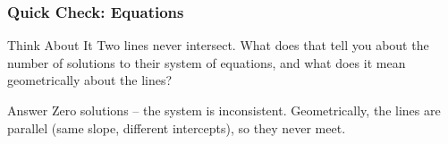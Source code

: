 \begin{frame}[fragile]\frametitle{Quick Check: Equations}
\begin{block}{Think About It}
Two lines never intersect. What does that tell you about the number of solutions to their system of equations, and what does it mean geometrically about the lines?
\end{block}
\pause
\begin{block}{Answer}
Zero solutions -- the system is inconsistent. Geometrically, the lines are parallel (same slope, different intercepts), so they never meet.
\end{block}
\end{frame}











